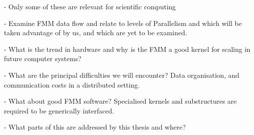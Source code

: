 - Only some of these are relevant for scientific computing

- Examine FMM data flow and relate to levels of Parallelism and which will be taken advantage of by us, and which are yet to be examined.


- What is the trend in hardware and why is the FMM a good kernel for scaling in future computer systems?

- What are the principal difficulties we will encounter? Data organisation, and communication costs in a distributed setting.

- What about good FMM software? Specialised kernels and substructures are required to be generically interfaced.

- What parts of this are addressed by this thesis and where?

